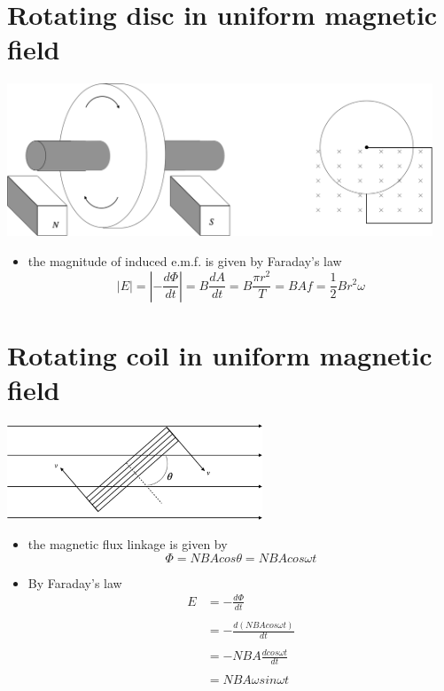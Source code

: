 \documentclass[a4paper, 10pt]{article}
\begin{document}
\section{Rotating disc in uniform magnetic field}
\begin{center}
   \includegraphics[width=5in]{figures/4.pdf} 
\end{center}	
\begin{itemize}
   \item the magnitude of induced e.m.f. is given by Faraday's law
      \[
      |E| = \left| - \frac{d\Phi}{dt}\right| = B \frac{dA}{dt} = B \frac{\pi r^2}{T} = BAf = \frac{1}{2}Br^2 \omega
      \]
      
\end{itemize}	

\section{Rotating coil in uniform magnetic field}
\begin{center}
   \includegraphics[width=3in]{figures/5.pdf} 
\end{center}	
\begin{itemize}
   \item the magnetic flux linkage is given by
      \[
      \Phi = NBA cos\theta = NBA cos \omega t
      \]
   \item By Faraday's law
     \begin{align*}
        E &= - \frac{d\Phi}{dt} \\ \\
          &= - \frac{d(NBAcos\omega t)}{dt} \\ \\
          &= -NBA \frac{d cos\omega t}{dt} \\ \\
          &= NBA \omega sin \omega t
     \end{align*}	 
      
\end{itemize}	
\end{document}
